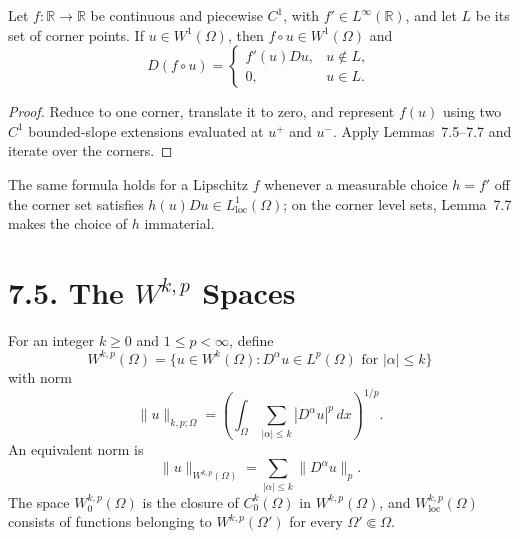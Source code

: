 \begin{theorem}
\label{gt:thm-sobolev-piecewise-chain-rule}
Let $f:\mathbb R\to\mathbb R$ be continuous and piecewise $C^1$, with
$f'\in L^\infty(\mathbb R)$, and let $L$ be its set of corner points. If
$u\in W^1(\Omega)$, then $f\circ u\in W^1(\Omega)$ and
\begin{equation}
\tag{7.21}
D(f\circ u)=
\begin{cases}
f'(u)Du,&u\notin L,\\
0,&u\in L.
\end{cases}
\end{equation}
\end{theorem}
\begin{proof}
\sketch Reduce to one corner, translate it to zero, and represent $f(u)$ using
two $C^1$ bounded-slope extensions evaluated at $u^+$ and $u^-$. Apply
Lemmas~7.5--7.7 and iterate over the corners.
\end{proof}

The same formula holds for a Lipschitz $f$ whenever a measurable choice
$h=f'$ off the corner set satisfies $h(u)Du\in L^1_{\mathrm{loc}}(\Omega)$;
on the corner level sets, Lemma~7.7 makes the choice of $h$ immaterial.

\section*{7.5. The $W^{k,p}$ Spaces}
\label{gt:sec-wkp-spaces}

\begin{definition}
\label{gt:def-sobolev-wkp-spaces}
For an integer $k\geq0$ and $1\leq p<\infty$, define
\[
W^{k,p}(\Omega)=\{u\in W^k(\Omega):D^\alpha u\in L^p(\Omega)
\text{ for }|\alpha|\leq k\}
\]
with norm
\begin{equation}
\tag{7.22}
\|u\|_{k,p;\Omega}
=\left(\int_\Omega\sum_{|\alpha|\leq k}|D^\alpha u|^p\,dx\right)^{1/p}.
\end{equation}
An equivalent norm is
\begin{equation}
\tag{7.23}
\|u\|_{W^{k,p}(\Omega)}=\sum_{|\alpha|\leq k}\|D^\alpha u\|_p.
\end{equation}
The space $W_0^{k,p}(\Omega)$ is the closure of $C_0^k(\Omega)$ in
$W^{k,p}(\Omega)$, and $W^{k,p}_{\mathrm{loc}}(\Omega)$ consists of functions
belonging to $W^{k,p}(\Omega')$ for every $\Omega'\Subset\Omega$.
\end{definition}

